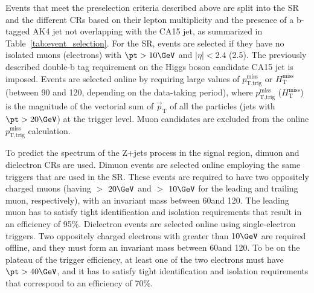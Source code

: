 Events that meet the preselection criteria described above are split into the SR and the different CRs based on their lepton multiplicity and the presence of a b-tagged AK4 jet not overlapping with the CA15 jet, as summarized in Table~\ref{tab:event_selection}. For the SR, events are selected if they have no isolated muons (electrons) with $\pt >10\GeV$ and $|\eta|< 2.4$ (2.5). The previously described double-b tag requirement on the Higgs boson candidate CA15 jet is imposed.
Events are selected online by requiring large values of $p_\text{T,trig}^\text{miss}$ or $H_{\text{T}}^{\text{miss}}$ (between 90 and 120\GeV, depending on the data-taking period), where $p_\text{T,trig}^\text{miss}$  ($H_{\text{T}}^{\text{miss}}$) is the magnitude of the vectorial sum of $\vec{p}_\text{T}$ of all the particles (jets with $\pt>20\GeV$) at the trigger level. Muon candidates are excluded from the online $p_\text{T,trig}^\text{miss}$ calculation.





To predict the \MET spectrum of the Z+jets process in the signal region, dimuon and dielectron CRs are used.
Dimuon events are selected online employing the same \MET triggers that are used in the SR.
These events are required to have two oppositely charged muons (having
\pt $>$ $20\GeV$ and \pt $>$ $10\GeV$ for the leading and trailing
muon, respectively), with an invariant mass between 60\GeV and 120\GeV.
The leading muon has to satisfy tight identification and isolation requirements that result in an efficiency of 95\%.
Dielectron events are selected online using single-electron triggers. %
Two oppositely charged electrons with \pt greater than $10\GeV$ are required offline, and they must form an invariant mass between 60\GeV and 120\GeV.
To be on the plateau of the trigger efficiency, at least one of the two electrons must have $\pt>40\GeV$, and it has to satisfy tight identification and isolation requirements that correspond to an efficiency of 70\%.

